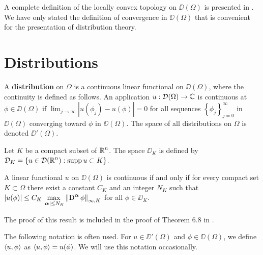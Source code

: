 A complete definition of the locally convex topology on $\DD(\Omega)$
is presented in \cite{RuFA,ReeSim}.  We have only stated the definition of
convergence in $\DD(\Omega)$ that is convenient for the presentation
of distribution theory.

\section{Distributions}

A {\bfseries distribution} on $\Omega$ is a
continuous linear functional on $\DD(\Omega)$, where the continuity is
defined as follows.  An application $u:\mathcal{D}(\Omega) \rightarrow \mathbb{C}$ is
continuous at $\phi \in \DD(\Omega)$ if
$\displaystyle \lim_{j\rightarrow \infty}|u(\phi_j)-u(\phi)| = 0$
for all sequences $\displaystyle \left\{ \phi_j\right\}_{j=0}^\infty$ in
$\DD(\Omega)$ converging toward $\phi$ in $\DD(\Omega)$.
The space of all distributions on $\Omega$ is denoted $\DD'(\Omega)$.

Let $K$ be a compact subset of $\displaystyle \mathbb{R}^n$.  The space
$\DD_K$ is defined by\\
$\displaystyle \mathcal{D}_K = \left\{ u \in \mathcal{D}(\mathbb{R}^n) : \operatorname{supp} u \subset K \right\}$.

\begin{prop} \label{distr_cont_cond}
A linear functional $u$ on $\DD(\Omega)$ is continuous if and only if
for every compact set $K \subset \Omega$ there exist a constant $C_K$
and an integer $N_K$ such that
$\displaystyle \left| u(\phi) \right| \leq C_K \max_{|{\bm{\alpha}}|\leq N_K}
\left\| \operatorname{D}^{{\bm{\alpha}}} \phi \right\|_{\infty,K}$
for all $\phi \in \DD_K$.
\end{prop}

The proof of this result is included in the proof of Theorem 6.8 in
\cite{RuFA}.

\begin{rmk}
The following notation is often used.  For $u \in \DD'(\Omega)$ and
$\phi \in \DD(\Omega)$, we define $\left\langle{u} , {\phi}\right\rangle$ as
$\left\langle{u} , {\phi}\right\rangle = u(\phi)$.  We will use this notation occasionally.
\end{rmk}

